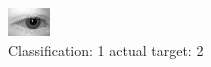 \begin{figure}[h!]
\begin{center}
\includegraphics[width=0.60\columnwidth]{figures/ID458_class_1_target_2.png}
\end{center}
\caption{ Classification: 1 actual target: 2}
\label{fig:ID458_class_1_target_2}
\end{figure}
